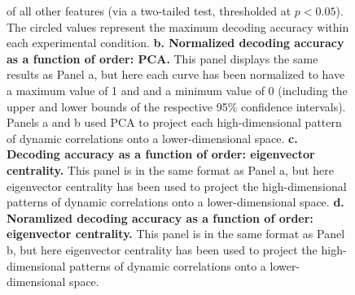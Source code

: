 \documentclass[english]{article}
\begin{document}
\begin{figure}[tp]
{    of all other features (via a two-tailed test, thresholded at
    $p < 0.05$).  The circled values represent the maximum decoding
    accuracy within each experimental condition.
    \textbf{b. Normalized decoding accuracy as a function of order:
      PCA.}  This panel displays the same results as Panel a, but here
    each curve has been normalized to have a maximum value of 1 and
    and a minimum value of 0 (including the upper and lower bounds of
    the respective 95\% confidence intervals).  Panels a and b used
    PCA to project each high-dimensional pattern of dynamic
    correlations onto a lower-dimensional space.  \textbf{c.  Decoding
      accuracy as a function of order: eigenvector centrality.} This
    panel is in the same format as Panel a, but here eigenvector
    centrality has been used to project the high-dimensional patterns
    of dynamic correlations onto a lower-dimensional space.
    \textbf{d. Noramlized decoding accuracy as a function of order:
      eigenvector centrality.} This panel is in the same format as
    Panel b, but here eigenvector centrality has been used to project
    the high-dimensional patterns of dynamic correlations onto a
    lower-dimensional space.}
  \label{fig:decoding}
\end{figure}
\end{document}
